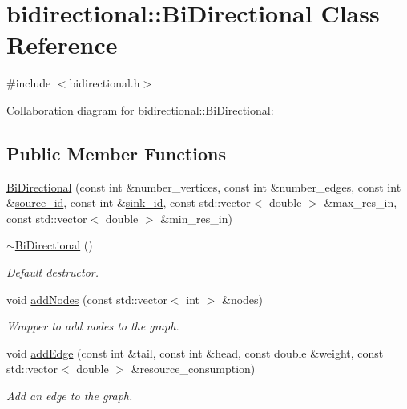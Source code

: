 \hypertarget{classbidirectional_1_1BiDirectional}{}\section{bidirectional\+:\+:Bi\+Directional Class Reference}
\label{classbidirectional_1_1BiDirectional}


{\ttfamily \#include $<$bidirectional.\+h$>$}



Collaboration diagram for bidirectional\+:\+:Bi\+Directional\+:
\subsection*{Public Member Functions}
\begin{DoxyCompactItemize}
\item 
\hyperlink{classbidirectional_1_1BiDirectional_aa8fc8de56198cce766bf887248136fc2}{Bi\+Directional} (const int \&number\+\_\+vertices, const int \&number\+\_\+edges, const int \&\hyperlink{classbidirectional_1_1BiDirectional_ae8256189cc23d7033a5e8e36ac36ec4a}{source\+\_\+id}, const int \&\hyperlink{classbidirectional_1_1BiDirectional_a742976c94bdf77c2bfae680ffd2e468d}{sink\+\_\+id}, const std\+::vector$<$ double $>$ \&max\+\_\+res\+\_\+in, const std\+::vector$<$ double $>$ \&min\+\_\+res\+\_\+in)
\item 
\hyperlink{classbidirectional_1_1BiDirectional_ae8a303f1eab194fb7df356c1900c9c7f}{$\sim$\+Bi\+Directional} ()
\begin{DoxyCompactList}\small\item\em Default destructor. \end{DoxyCompactList}\item 
void \hyperlink{classbidirectional_1_1BiDirectional_a37633f0f701bfb6a5f3a212212316f29}{add\+Nodes} (const std\+::vector$<$ int $>$ \&nodes)
\begin{DoxyCompactList}\small\item\em Wrapper to add nodes to the graph. \end{DoxyCompactList}\item 
void \hyperlink{classbidirectional_1_1BiDirectional_a5e4873f624300e7c3620e00758c98a35}{add\+Edge} (const int \&tail, const int \&head, const double \&weight, const std\+::vector$<$ double $>$ \&resource\+\_\+consumption)
\begin{DoxyCompactList}\small\item\em Add an edge to the graph. \end{DoxyCompactList}\item 

\end{DoxyCompactItemize}
